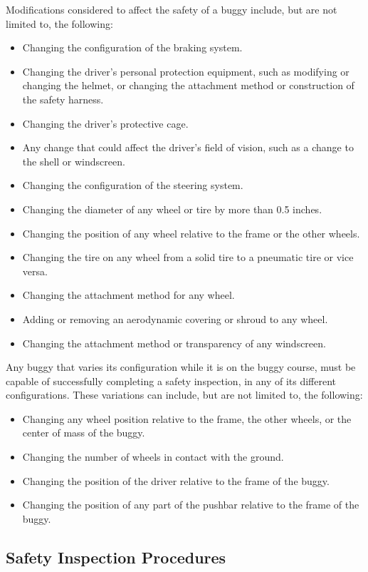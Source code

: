 Modifications considered to affect the safety of a buggy include, but are not limited to, the following:
\begin{itemize}
	\item Changing the configuration of the braking system.
	\item Changing the driver's personal protection equipment, such as modifying or changing the helmet, or changing the attachment method or construction of the safety harness.
	\item Changing the driver's protective cage.
	\item Any change that could affect the driver's field of vision, such as a change to the shell or windscreen.
	\item Changing the configuration of the steering system.
	\item Changing the diameter of any wheel or tire by more than 0.5 inches.
	\item Changing the position of any wheel relative to the frame or the other wheels.
	\item Changing the tire on any wheel from a solid tire to a pneumatic tire or vice versa.
	\item Changing the attachment method for any wheel.
	\item Adding or removing an aerodynamic covering or shroud to any wheel.
	\item Changing the attachment method or transparency of any windscreen.
\end{itemize}

Any buggy that varies its configuration while it is on the buggy course, must be capable of successfully completing a safety inspection, in any of its different configurations. These variations can include, but are not limited to, the following:
\begin{itemize}
	\item Changing any wheel position relative to the frame, the other wheels, or the center of mass of the buggy.
	\item Changing the number of wheels in contact with the ground.
	\item Changing the position of the driver relative to the frame of the buggy.
	\item Changing the position of any part of the pushbar relative to the frame of the buggy.
\end{itemize}

\subsection{Safety Inspection Procedures}

